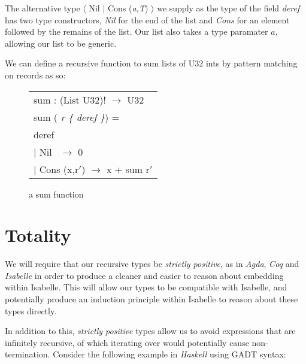 The alternative type {$\langle$ Nil $\vert$ Cons (\textit{a,T}) $\rangle$} we supply as the type of the field
\textit{deref} has two type constructors, \textit{Nil} for the end of the list and \textit{Cons} for an element
followed by the remains of the list. Our list also takes a type paramater $a$, allowing our list to be generic.

We can define a recursive function to sum lists of U32 ints by pattern matching on records as so:

\begin{figure}[!htbp]
    \begin{center}
        \begin{tabular}{l}
            sum : (List U32)! $\rightarrow$ U32 \\
            sum (\textit{ r \{ deref \}}) = \\
            \hspace{0.8em} deref \\
                \hspace{2em} $\vert$ Nil  \quad\quad\quad$\,$   $\rightarrow$ 0 \\
                \hspace{2em} $\vert$ Cons (x,r$'$)  $\rightarrow$ x + sum r$'$
        \end{tabular}
    \end{center}
    \caption[short]{a sum function}
    \label{fig:sum}
\end{figure}



\section{Totality}

We will require that our recursive types be \textit{strictly positive}, as in \textit{Agda},
\textit{Coq} and \textit{Isabelle} in order to produce a cleaner and easier to reason about
embedding within Isabelle. This will allow our types to be compatible with Isabelle, and potentially
produce an induction principle within Isabelle to reason about these types directly.

In addition to this, \textit{strictly positive} types allow us to avoid expressions that are infinitely recursive,
of which iterating over would potentially cause non-termination. Consider
the following example in \textit{Haskell} using GADT syntax:

\pagebreak


